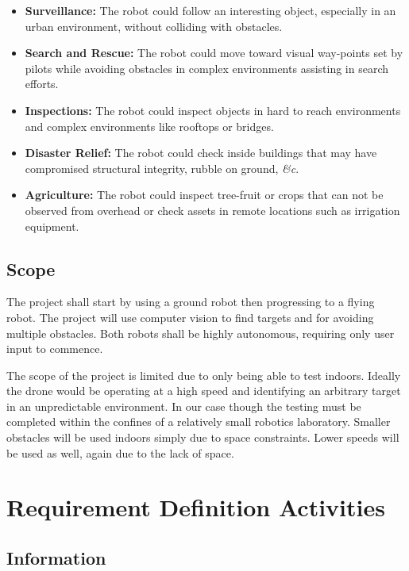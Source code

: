 \documentclass{article}
\begin{document}
		\begin{itemize}
			\item \textbf{Surveillance:} The robot could follow an interesting object, especially in an urban environment, without colliding with obstacles.
			\item \textbf{Search and Rescue:} The robot could move toward visual way-points set by pilots while avoiding obstacles in complex environments assisting in search efforts.
			\item \textbf{Inspections:} The robot could inspect objects in hard to reach environments and complex environments like rooftops or bridges.
			\item \textbf{Disaster Relief:} The robot could check inside buildings that may have compromised structural integrity, rubble on ground, \textit{\&c}.
			\item \textbf{Agriculture:} The robot could inspect tree-fruit or crops that can not be observed from overhead or check assets in remote locations such as irrigation equipment.
		\end{itemize}
		
	\subsection{Scope}
	
	The project shall start by using a ground robot then progressing to a flying robot. The project will use computer vision to find targets and for avoiding multiple obstacles. Both robots shall be highly autonomous, requiring only user input to commence. 

	The scope of the project is limited due to only being able to test indoors. Ideally the drone would be operating at a high speed and identifying an arbitrary target in an unpredictable environment. In our case though the testing must be completed within the confines of a relatively small robotics laboratory. Smaller obstacles will be used indoors simply due to space constraints. Lower speeds will be used as well, again due to the lack of space. 

\section{Requirement Definition Activities}

	\subsection{Information}
	
\end{document}
